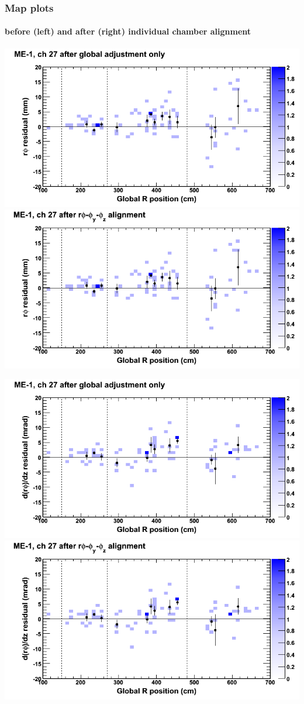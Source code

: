 \documentclass[compress]{beamer}
\begin{document}
\begin{frame}
\frametitle{Map plots}
\framesubtitle{before (left) and after (right) individual chamber alignment}
\includegraphics[width=0.5\linewidth]{ringmapplots_3dof/before_CSCvsr_mem1ch27_x.png} \includegraphics[width=0.5\linewidth]{ringmapplots_3dof/after_CSCvsr_mem1ch27_x.png}

\includegraphics[width=0.5\linewidth]{ringmapplots_3dof/before_CSCvsr_mem1ch27_dxdz.png} \includegraphics[width=0.5\linewidth]{ringmapplots_3dof/after_CSCvsr_mem1ch27_dxdz.png}
\end{frame}
\end{document}
